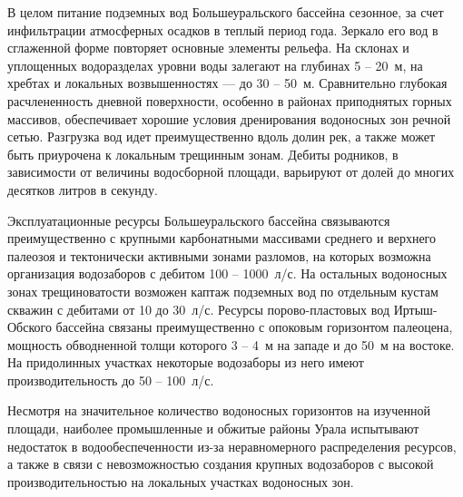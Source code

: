 В целом питание подземных вод Большеуральского бассейна сезонное, за счет инфильтрации атмосферных осадков в теплый период года. Зеркало его вод в сглаженной форме повторяет основные элементы рельефа. На склонах и уплощенных водоразделах уровни воды залегают на глубинах 5  --  20~м, на хребтах и локальных возвышенностях  ---  до 30  --  50~м. Сравнительно глубокая расчлененность дневной поверхности, особенно в районах приподнятых горных массивов, обеспечивает хорошие условия дренирования водоносных зон речной сетью. Разгрузка вод идет преимущественно вдоль долин рек, а также может быть приурочена к локальным трещинным зонам. Дебиты родников, в зависимости от величины водосборной площади, варьируют от долей до многих десятков литров в секунду.

Эксплуатационные ресурсы Большеуральского бассейна связываются преимущественно с крупными карбонатными массивами среднего и верхнего палеозоя и тектонически активными зонами разломов, на которых возможна организация водозаборов с дебитом 100  --  1000~л/с. На остальных водоносных зонах трещиноватости возможен каптаж подземных вод по отдельным кустам скважин с дебитами от 10 до 30~л/с. Ресурсы порово-пластовых вод Иртыш-Обского бассейна связаны преимущественно с опоковым горизонтом палеоцена, мощность обводненной толщи которого 3  --  4~м на западе и до 50~м на востоке. На придолинных участках некоторые водозаборы из него имеют производительность до 50 -- 100~л/с.

Несмотря на значительное количество водоносных горизонтов на изученной площади, наиболее промышленные и обжитые районы Урала испытывают недостаток в водообеспеченности из-за неравномерного распределения ресурсов, а также в связи с невозможностью создания крупных водозаборов с высокой производительностью на локальных участках водоносных зон.
